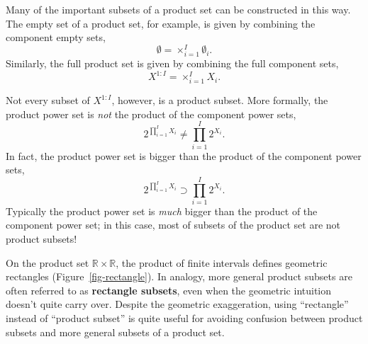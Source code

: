\documentclass[
  letterpaper,
  DIV=11,
  numbers=noendperiod]{scrartcl}
\begin{document}
Many of the important subsets of a product set can be constructed in
this way. The empty set of a product set, for example, is given by
combining the component empty sets, \[
\emptyset = \times_{i = 1}^{I} \emptyset_{i}.
\] Similarly, the full product set is given by combining the full
component sets, \[
X^{1:I} = \times_{i = 1}^{I} X_{i}.
\]

Not every subset of \(X^{1:I}\), however, is a product subset. More
formally, the product power set is \emph{not} the product of the
component power sets, \[
2^{ \prod_{i = 1}^{I} X_{i} }
\ne
\prod_{i = 1}^{I} 2^{X_{i}}.
\] In fact, the product power set is bigger than the product of the
component power sets, \[
2^{ \prod_{i = 1}^{I} X_{i} }
\supset
\prod_{i = 1}^{I} 2^{X_{i}}.
\] Typically the product power set is \emph{much} bigger than the
product of the component power set; in this case, most of subsets of the
product set are not product subsets!

On the product set \(\mathbb{R} \times \mathbb{R}\), the product of
finite intervals defines geometric rectangles
(Figure~\ref{fig-rectangle}). In analogy, more general product subsets
are often referred to as \textbf{rectangle subsets}, even when the
geometric intuition doesn't quite carry over. Despite the geometric
exaggeration, using ``rectangle'' instead of ``product subset'' is quite
useful for avoiding confusion between product subsets and more general
subsets of a product set.
\end{document}
